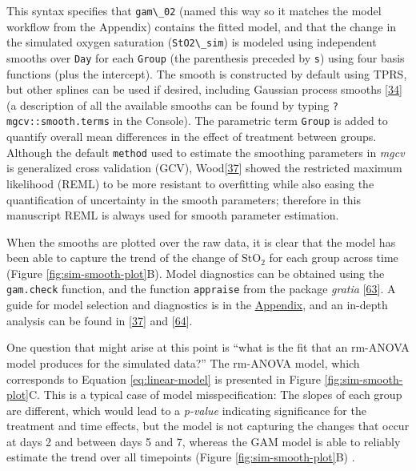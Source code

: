 \documentclass[
]{article}
\newcommand{\passthrough}[1]{#1}
\begin{document}
This syntax specifies that \passthrough{\lstinline!gam\_02!} (named this way so it matches the model workflow from the Appendix) contains the fitted model, and that the change in the simulated oxygen saturation (\passthrough{\lstinline!StO2\_sim!}) is modeled using independent smooths over \passthrough{\lstinline!Day!} for each \passthrough{\lstinline!Group!} (the parenthesis preceded by \passthrough{\lstinline!s!}) using four basis functions (plus the intercept). The smooth is constructed by default using TPRS, but other splines can be used if desired, including Gaussian process smooths {[}\protect\hyperlink{ref-simpson2018}{34}{]} (a description of all the available smooths can be found by typing \passthrough{\lstinline!?mgcv::smooth.terms!} in the Console). The parametric term \passthrough{\lstinline!Group!} is added to quantify overall mean differences in the effect of treatment between groups. Although the default \passthrough{\lstinline!method!} used to estimate the smoothing parameters in \emph{mgcv} is generalized cross validation (GCV), Wood{[}\protect\hyperlink{ref-wood2017}{37}{]} showed the restricted maximum likelihood (REML) to be more resistant to overfitting while also easing the quantification of uncertainty in the smooth parameters; therefore in this manuscript REML is always used for smooth parameter estimation.

When the smooths are plotted over the raw data, it is clear that the model has been able to capture the trend of the change of \(\mbox{StO}_2\) for each group across time (Figure \ref{fig:sim-smooth-plot}B). Model diagnostics can be obtained using the \passthrough{\lstinline!gam.check!} function, and the function \passthrough{\lstinline!appraise!} from the package \emph{gratia} {[}\protect\hyperlink{ref-gratia}{63}{]}. A guide for model selection and diagnostics is in the \protect\hyperlink{workflow}{Appendix}, and an in-depth analysis can be found in {[}\protect\hyperlink{ref-wood2017}{37}{]} and {[}\protect\hyperlink{ref-harezlak2018}{64}{]}.

One question that might arise at this point is ``what is the fit that an rm-ANOVA model produces for the simulated data?'' The rm-ANOVA model, which corresponds to Equation \eqref{eq:linear-model} is presented in Figure \ref{fig:sim-smooth-plot}C. This is a typical case of model misspecification: The slopes of each group are different, which would lead to a \emph{p-value} indicating significance for the treatment and time effects, but the model is not capturing the changes that occur at days 2 and between days 5 and 7, whereas the GAM model is able to reliably estimate the trend over all timepoints (Figure \ref{fig:sim-smooth-plot}B) .
\end{document}
